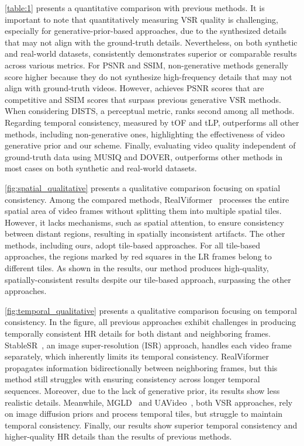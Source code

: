 \cref{table:1} presents a quantitative comparison with previous methods. It is important to note that quantitatively measuring VSR quality is challenging, especially for generative-prior-based approaches, due to the synthesized details that may not align with the ground-truth details. Nevertheless, on both synthetic and real-world datasets, \ours{} consistently demonstrates superior or comparable results across various metrics. For PSNR and SSIM, non-generative methods generally score higher because they do not synthesize high-frequency details that may not align with ground-truth videos. However, \ours{} achieves PSNR scores that are competitive and SSIM scores that surpass previous generative VSR methods. When considering DISTS, a perceptual metric, \ours{} ranks second among all methods. Regarding temporal consistency, measured by tOF and tLP, \ours{} outperforms all other methods, including non-generative ones, highlighting the effectiveness of video generative prior and our {\tfiabb} scheme. Finally, evaluating video quality independent of ground-truth data using MUSIQ and DOVER, \ours{} outperforms other methods in most cases on both synthetic and real-world datasets.

\cref{fig:spatial_qualitative} presents a qualitative comparison focusing on spatial consistency. 
Among the compared methods, RealViformer~\cite{realviformer} processes the entire spatial area of video frames without splitting them into multiple spatial tiles. However, it lacks mechanisms, such as spatial attention, to ensure consistency between distant regions, resulting in spatially inconsistent artifacts. The other methods, including ours, adopt tile-based approaches. 
For all tile-based approaches, the regions marked by red squares in the LR frames belong to different tiles.
As shown in the results, our method produces high-quality, spatially-consistent results despite our tile-based approach, surpassing the other approaches.

\cref{fig:temporal_qualitative} presents a qualitative comparison focusing on temporal consistency. In the figure, all previous approaches exhibit challenges in producing temporally consistent HR details for both distant and neighboring frames. StableSR~\cite{stablesr}, an image super-resolution (ISR) approach, handles each video frame separately, which inherently limits its temporal consistency.
RealViformer~\cite{realviformer} propagates information bidirectionally between neighboring frames, but this method still struggles with ensuring consistency across longer temporal sequences.
Moreover, due to the lack of generative prior, its results show less realistic details.
Meanwhile, MGLD~\cite{yang2023mgldvsr} and UAVideo~\cite{zhou2024upscaleavideo}, both VSR approaches, rely on image diffusion priors and process temporal tiles, but struggle to maintain temporal consistency.
Finally, our results show superior temporal consistency and higher-quality HR details than the results of previous methods. 

